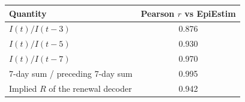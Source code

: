 \begin{tabular}{lc}
\hline
Quantity & Pearson $r$ vs EpiEstim \\
\hline
$I(t)/I(t-3)$ & 0.876 \\
$I(t)/I(t-5)$ & 0.930 \\
$I(t)/I(t-7)$ & 0.970 \\
7-day sum / preceding 7-day sum & 0.995 \\
\hline
Implied $R$ of the renewal decoder & 0.942 \\
\hline
\end{tabular}
